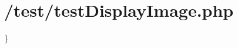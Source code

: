 \hypertarget{_2test_2test_display_image_8php-example}{
\section{/test/test\-Display\-Image.\-php}
}
\}


\begin{DoxyCodeInclude}
\end{DoxyCodeInclude}
 